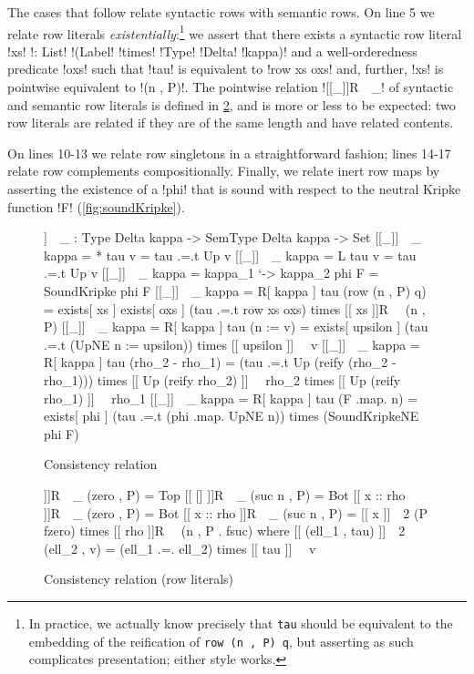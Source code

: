 \documentclass[sigplan,10pt,anonymous,review]{acmart}\settopmatter{printfolios=true,printccs=false,printacmref=false}
\begin{document}
The cases that follow relate syntactic rows with semantic rows. On line 5 we relate row literals \emph{existentially}:\footnote{In practice, we actually know precisely that \lstinline{tau} should be equivalent to the embedding of the reification of \lstinline{row (n , P) q}, but asserting as such complicates presentation; either style works.} we assert that there exists a syntactic row literal !xs! !: List! !(Label! !times! !Type! !Delta! !kappa)! and a well-orderedness predicate !oxs! such that !tau! is equivalent to !row xs oxs! and, further, !xs! is pointwise equivalent to !(n , P)!. The pointwise relation ![[_]]R~~_! of syntactic and semantic row literals is defined in \cref{fig:consistency-relation-row-literals}, and is more or less to be expected: two row literals are related if they are of the same length and have related contents. 

On lines 10-13 we relate row singletons in a straightforward fashion; lines 14-17 relate row complements compositionally. Finally, we relate inert row maps by asserting the existence of a !phi! that is sound with respect to the neutral Kripke function !F! (\cref{fig:soundKripke}).

\begin{figure}
\begin{agdaf}
[[_]]~~_ : Type Delta kappa -> SemType Delta kappa -> Set
[[_]]~~_ {kappa = *} tau  v = tau .=.t Up v
[[_]]~~_ {kappa = L} tau  v = tau .=.t Up v
[[_]]~~_ {kappa = kappa_1 `-> kappa_2} phi F = SoundKripke phi F
[[_]]~~_ {kappa = R[ kappa ]} tau (row (n , P) q) =
  exists[ xs ] 
  exists[ oxs ]
  (tau .=.t row xs oxs) times
  [[ xs ]]R~~ (n , P)
[[_]]~~_ {kappa = R[ kappa ]} tau (n := v) = 
  exists[ upsilon ]
  (tau .=.t (UpNE n := upsilon)) times
  [[ upsilon ]]~~ v
[[_]]~~_ {kappa = R[ kappa ]} tau (rho_2 - rho_1) = 
  (tau .=.t Up (reify (rho_2 - rho_1))) times 
  [[ Up (reify rho_2) ]]~~ rho_2 times 
  [[ Up (reify rho_1) ]]~~ rho_1
[[_]]~~_ {kappa = R[ kappa ]} tau (F .map. n) = 
  exists[ phi ]
  (tau .=.t (phi .map. UpNE n)) times
  (SoundKripkeNE phi F)
\end{agdaf}
\caption{Consistency relation}
\label{fig:consistency-relation}
\end{figure}
\begin{figure}
\begin{agda}
[[ [] ]]R~~_ (zero , P) = Top
[[ [] ]]R~~_ (suc n , P) = Bot
[[ x :: rho ]]R~~_ (zero , P) = Bot
[[ x :: rho ]]R~~_ (suc n , P) = 
  [[ x ]]~~2 (P fzero) times 
  [[ rho ]]R~~ (n , P . fsuc)
  where
    [[ (ell_1 , tau) ]]~~2 (ell_2 , v) = 
      (ell_1 .=. ell_2) times [[ tau ]]~~ v 
\end{agda}
\caption{Consistency relation (row literals)}
\label{fig:consistency-relation-row-literals}
\end{figure}
\end{document}
